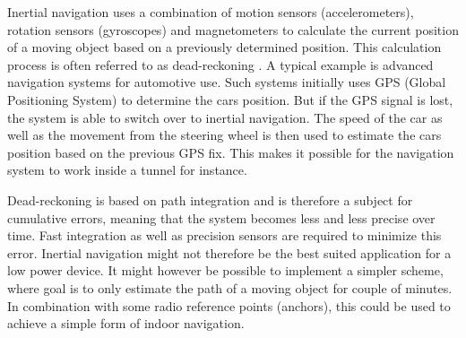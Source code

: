 Inertial navigation uses a combination of motion sensors (accelerometers), rotation sensors (gyroscopes) and magnetometers to calculate the current position of a moving object based on a previously determined position. This calculation process is often referred to as dead-reckoning \cite{dead_reckoning}. A typical example is advanced navigation systems for automotive use. Such systems initially uses GPS (Global Positioning System) to determine the cars position. But if the GPS signal is lost, the system is able to switch over to inertial navigation. The speed of the car as well as the movement from the steering wheel is then used to estimate the cars position based on the previous GPS fix. This makes it possible for the navigation system to work inside a tunnel for instance. 

Dead-reckoning is based on path integration and is therefore a subject for cumulative errors, meaning that the system becomes less and less precise over time. Fast integration as well as precision sensors are required to minimize this error. Inertial navigation might not therefore be the best suited application for a low power device. It might however be possible to implement a simpler scheme, where goal is to only estimate the path of a moving object for couple of minutes. In combination with some radio reference points (anchors), this could be used to achieve a simple form of indoor navigation.  